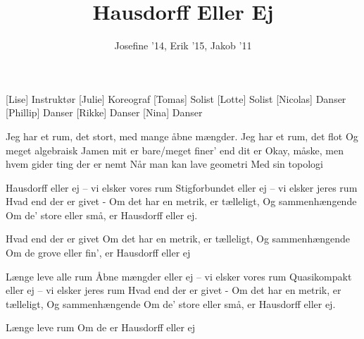 \documentclass[a4paper,11pt]{article}
\title{Hausdorff Eller Ej}
\author{Josefine '14, Erik '15, Jakob '11}
\begin{document}
\maketitle

\begin{roles}
[Lise] Instruktør
[Julie] Koreograf
[Tomas] Solist
[Lotte] Solist
[Nicolas] Danser
[Phillip] Danser
[Rikke] Danser
[Nina] Danser
\end{roles}

\begin{song}

 Jeg har et rum, det stort, 
med mange åbne mængder.
 Jeg har et rum, det flot
Og meget algebraisk
 Jamen mit er bare/meget finer’ end dit er
 Okay, måske, men hvem gider ting der er nemt
Når man kan lave geometri 
Med sin topologi

 Hausdorff eller ej – 
vi elsker vores rum
Stigforbundet eller ej – 
vi elsker jeres rum
 Hvad end der er givet -
 Om det har en metrik, er tælleligt,
Og sammenhængende
 Om de' store eller små, 
er Hausdorff eller ej.

 Hvad end der er givet
Om det har en metrik, er tælleligt,
Og sammenhængende
 Om de grove eller fin', 
er Hausdorff eller ej

 Længe leve alle rum
Åbne mængder eller ej – 
vi elsker vores rum
Quasikompakt eller ej – 
vi elsker jeres rum
 Hvad end der er givet -
Om det har en metrik, er tælleligt,
Og sammenhængende
 Om de' store eller små, 
er Hausdorff eller ej.

 Længe leve rum
 Om de er Hausdorff eller ej







\end{song}
\end{document}
